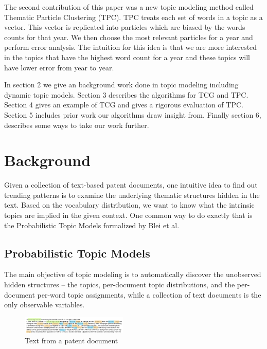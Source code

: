 \documentclass[conference]{IEEEtran}
\begin{document}
The second contribution of this paper was a new topic modeling method called Thematic Particle Clustering (TPC). TPC treats each set of words in a topic as a vector. This vector is replicated into particles which are biased by the words counts for that year. We then choose the most relevant particles for a year and perform error analysis. The intuition for this idea is that we are more interested in the topics that have the highest word count for a year and these topics will have lower error from year to year.

In section 2 we give an background work done in topic modeling including dynamic topic models. Section 3 describes the algorithms for TCG and TPC. Section 4 gives an example of  TCG and gives a rigorous evaluation of TPC. Section 5 includes prior work our algorithms draw insight from. Finally section 6, describes some ways to take our work further.

\section{Background}

Given a collection of text-based patent documents, one intuitive idea to find out trending patterns is to examine the underlying thematic structures hidden in the text. Based on the vocabulary distribution, we want to know what the intrinsic topics are implied in the given context. One common way to do exactly that is the Probabilistic Topic Models formalized by  Blei et al. \cite{blei2011}

\subsection{Probabilistic Topic Models}

The main objective of topic modeling is to automatically discover the unobserved hidden structures -- the topics, per-document topic distributions, and the per-document per-word topic assignments, while a collection of text documents is the only observable variables. 

\begin{figure}[h]
    \center    
	\includegraphics[width=0.45\textwidth]{fig/pat007.png}
	\caption{Text from a patent document}
	\label{sample_patent}
\end{figure}
\end{document}
